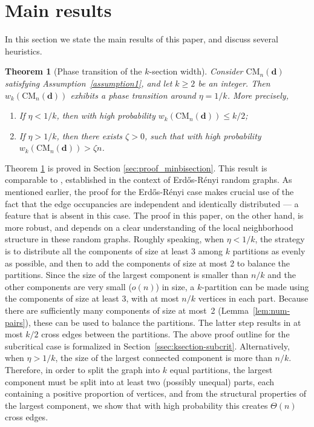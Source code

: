 \documentclass[11pt,a4paper, reqno]{article}
\numberwithin{equation}{section}
\numberwithin{equation}{section}
\newcommand{\1}{\ensuremath{\mathbbm{1}}}
\newcommand{\CM}{\ensuremath{\mathrm{CM}_n(\boldsymbol{d})}}
\newtheorem{theorem}{Theorem}
\numberwithin{equation}{section}
\numberwithin{theorem}{section}
\begin{document}
\section{Main results}
\label{sec:main_results}
In this section we state the main results of this paper, and discuss several heuristics.
\begin{theorem}[Phase transition of the $k$-section width]\label{thm:min-bis}
Consider $\CM$ satisfying {\rm Assumption~\ref{assumption1}}, and let $k\geq 2$ be an integer.
 Then $w_k(\CM)$ exhibits a phase transition around $\eta =1/k$. More precisely, 
 \begin{enumerate}[{\normalfont (i)}]
 \item \label{thm:min-bis-i} If $\eta <1/k$, then  with high probability $w_k(\CM)\leq k/2$;
 \item \label{thm:min-bis-ii} If $\eta >1/k$, then there exists $\zeta>0$, such that with high probability $w_k(\CM)>\zeta n$.
 \end{enumerate}
\end{theorem}
Theorem \ref{thm:min-bis} is proved in Section \ref{sec:proof_minbisection}. This result is comparable to \cite[Theorem 1]{LM01}, established in the context of Erd\H{o}s-R\'enyi random graphs. 
As mentioned earlier, the proof for the Erd\H{o}s-R\'enyi case makes crucial use of the fact that the edge occupancies are independent and identically distributed --- a feature that is absent in this case. 
The proof in this paper, on the other hand, is more robust, and depends on a clear understanding of the local neighborhood structure in these random graphs. 
Roughly speaking, when $\eta<1/k$, the strategy is to distribute all the components of size at least 3 among $k$ partitions as evenly as possible, and then to add the components of size at most 2 to balance the partitions.
Since  the size of the largest component is smaller than $n/k$ and the other components are very small ($o(n)$) in size, a $k$-partition  can be made using the components of size at least 3, with at most $n/k$ vertices in each part.
Because there are sufficiently many components of size at most~2 (Lemma~\ref{lem:num-pairs}),
these can be used to balance the partitions. 
The latter step results in at most $k/2$ cross edges between the partitions. 
The above proof outline for the subcritical case is formalized in Section~\ref{ssec:ksection-subcrit}. 
Alternatively, when $\eta>1/k$, the size of the largest connected component is more than $n/k$. 
Therefore, in order to split the graph into $k$ equal partitions,
the largest component must be split into at least two (possibly unequal) parts, each containing a positive proportion of vertices, and from the structural properties of the largest component, we show that with high probability this creates $\Theta(n)$ cross edges. 
\end{document}
